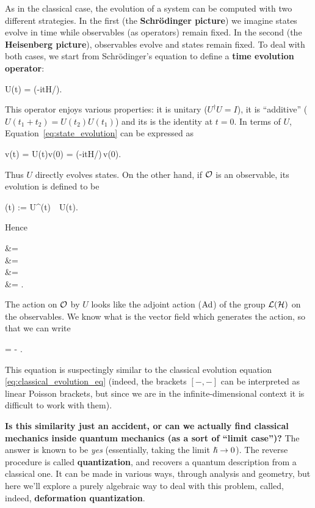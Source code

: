 \documentclass[main.tex]{subfiles}
\begin{document}
As in the classical case, the evolution of a system can be computed with two different strategies. In the first (the \textbf{Schr\"odinger picture}) we imagine states evolve in time while observables (as operators) remain fixed. In the second (the \textbf{Heisenberg picture}), observables evolve and states remain fixed. To deal with both cases, we start from Schr\"odinger's equation to define a \textbf{time evolution operator}:
\begin{eqalign}
	U(t) = \exp(-itH/\planck).
\end{eqalign}
This operator enjoys various properties: it is unitary ($U^\dagger U = I$), it is ``additive'' ($U(t_1+t_2)=U(t_2)U(t_1)$) and its is the identity at $t=0$. In terms of $U$, Equation~\eqref{eq:state_evolution} can be expressed as
\begin{eqalign}
	v(t) = U(t)v(0) = \exp(-itH/\planck)\,v(0).
\end{eqalign}
Thus $U$ directly evolves states. On the other hand, if $\mathcal{O}$ is an observable, its evolution is defined to be
\begin{eqalign}
	\obs(t) := U^\dagger(t)\, \obs\, U(t).
\end{eqalign}
Hence
\begin{eqalign}
	 &= \\
	&= \\
	&= \\
	&= .
\end{eqalign}
The action on $\mathcal{O}$ by $U$ looks like the adjoint action ($\operatorname{Ad}$) of the group $\mathcal{L}(\mathcal{H})$ on the observables. We know what is the vector field which generates the action, so that we can write
\begin{eqalign}
\label{eq:qm_evolution}
	 = - \planck [\obs(t), H].
\end{eqalign}
This equation is suspectingly similar to the classical evolution equation \eqref{eq:classical_evolution_eq} (indeed, the brackets $[-,-]$ can be interpreted as linear Poisson brackets, but since we are in the infinite-dimensional context it is difficult to work with them).

\textbf{Is this similarity just an accident, or can we actually find classical mechanics inside quantum mechanics (as a sort of ``limit case'')?} The answer is known to be \emph{yes} (essentially, taking the limit ${\boldsymbol\hslash} \to 0$). The reverse procedure is called \textbf{quantization}, and recovers a quantum description from a classical one. It can be made in various ways, through analysis and geometry, but here we'll explore a purely algebraic way to deal with this problem, called, indeed, \textbf{deformation quantization}.
\end{document}
